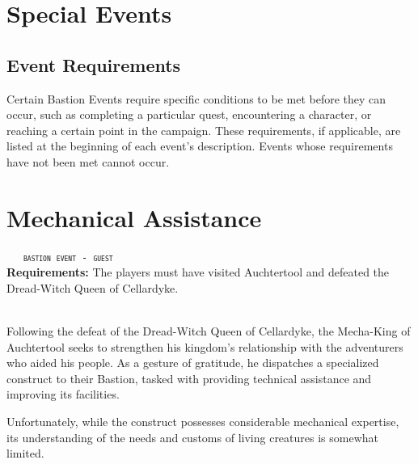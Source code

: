 \section*{Special Events}
\subsection*{Event Requirements}
{\entryfont Certain Bastion Events require specific conditions to be met before they can occur, such as completing a particular quest, encountering a character, or reaching a certain point in the campaign. These requirements, if applicable, are listed at the beginning of each event's description. Events whose requirements have not been met cannot occur.}

\clearpage

\section*{Mechanical Assistance}
{\vspace*{-0.5em}\ \ \ \footnotesize\texttt{\textsc{bastion event - guest}}}\vspace*{0.15em}\\
{\entryfont \textbf{Requirements:} The players must have visited Auchtertool and defeated the Dread-Witch Queen of Cellardyke.}\\\\
{\entryfont Following the defeat of the Dread-Witch Queen of Cellardyke, the Mecha-King of Auchtertool seeks to strengthen his kingdom's relationship with the adventurers who aided his people. As a gesture of gratitude, he dispatches a specialized construct to their Bastion, tasked with providing technical assistance and improving its facilities.

Unfortunately, while the construct possesses considerable mechanical expertise, its understanding of the needs and customs of living creatures is somewhat limited.}

\clearpage


